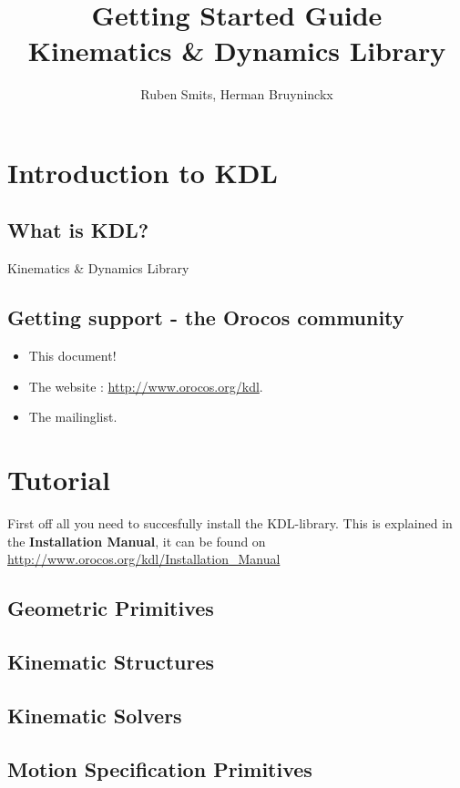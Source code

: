 \documentclass[a4paper,10pt]{report}
\title{Getting Started Guide \\ Kinematics \& Dynamics Library}
\author{Ruben Smits, Herman Bruyninckx}
\begin{document}
\maketitle

\chapter{Introduction to KDL}
\label{cha:introduction-kdl}

\section{What is KDL?}
\label{sec:what-kdl}
Kinematics \& Dynamics Library 


\section{Getting support - the Orocos community}
\label{sec:gett-supp-oroc}

\begin{itemize}
\item This document!
\item The website : \url{http://www.orocos.org/kdl}.
\item The mailinglist. 
\end{itemize}

\chapter{Tutorial}
\label{cha:tutorial}

First off all you need to succesfully install the KDL-library. This is
explained in the \textbf{Installation Manual}, it can be found on
\url{http://www.orocos.org/kdl/Installation_Manual}


\section{Geometric Primitives}
\label{sec:geometric-primitives}

\section{Kinematic Structures}
\label{sec:kinematic-structures}

\section{Kinematic Solvers}
\label{sec:kinematic-solvers}

\section{Motion Specification Primitives}
\label{sec:moti-spec-prim}


\todos
\end{document}
